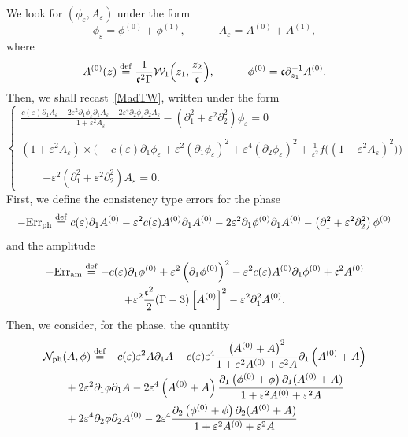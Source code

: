 \documentclass[10pt]{amsart}
\theoremstyle{definition}\newtheorem{defi}[theo]{Definition}\newtheorem{rema}[theo]{Remark}\newtheorem{exam}[theo]{Example}\newtheorem{exem}[theo]{Example}\newtheorem{nota}[theo]{Notation}
\newcommand*\p{\partial}
\newcommand*\ddef{\stackrel{\rm def}{=}}
\newcommand{\amm}{\mathrm{am}}
\newcommand{\phl}{\mathrm{ph}}
\newcommand{\Err}{\mathrm{Err}}
\newcommand*\BN{\mathcal{N}}
\newcommand*\BW{\mathcal{W}}
\newcommand*\ds{\displaystyle}
\newcommand*\cs{{\mathfrak c}}
\newcommand*\e{\varepsilon}
\newcommand*\G{\Gamma}
\begin{document}
We look for $ (\phi_\e, A_\e)$ under the form
\[
\phi_\e = \phi^{(0)} + \phi^{(1)},
\quad \quad \quad A_\e = A^{(0)} + A^{(1)},
\]
where
\begin{equation}\label{choixA-phi}
A^{(0)} (z) \ddef \frac{1}{\cs^2 \G} \BW_1 \Big(z_1, \frac{z_2}{\cs} \Big),
\quad \quad \quad \phi^{(0)} = \cs \p_{z_1}^{-1} A^{(0)}.
\end{equation} Then, we shall recast~\eqref{MadTW}, written under the form
\begin{equation*}
\left\{
\begin{array}{ll}
\ds{
\frac{ c(\e) \p_{1} A_\e - 2 \e^2 \p_{1} \phi_\e \p_{1} A_\e - 2 \e^4 \p_{2} \phi_\e \p_{2} A_\e }{ 1 + \e^2 A_\e } - \left(\p_{1}^2 + \e^2 \p^2_{2}\right) \phi_\e } = 0 \\ \ \\
\ds{ \left(1+\e^2 A_\e\right) \times \Big(- c(\e) \p_{1} \phi_\e + \e^2 (\p_{1} \phi_\e)^2 + \e^4 (\p_{2} \phi_\e)^2 + \frac{1}{\e^2} f \big(\left(1 +\e^2 A_\e\right)^2 \big) \Big)}
\\ \ \\ \qquad \ds{ - \e^2 \left(\p_{1}^2 + \e^2 \p_{2}^2\right) A_\e = 0}.
\end{array}\right.
\end{equation*}
First, we define the consistency type errors for the phase
\[
- \Err_{\phl}
\ddef c(\e) \p_{1} A^{(0)} - \e^2 c (\e) A^{(0)} \p_{1} A^{(0)} - 2 \e^2 \p_{1} \phi^{(0)} \p_{1} A^{(0)} - \left(\p_{1}^2 + \e^2 \p^2_{2}\right) \phi^{(0)}
\]
and the amplitude
\begin{multline*}
- \Err_{\amm} \ddef - c(\e) \p_{1} \phi^{(0)} + \e^2 \left(\p_{1} \phi^{(0)}\right)^2 - \e^2 c(\e) A^{(0)} \p_{1} \phi^{(0)} + \cs^2 A^{(0)}
\\+ \e^2 \frac{\cs^2}{2} (\Gamma -3) \left[A^{(0)}\right]^2 - \e^2 \p_{1}^2 A^{(0)}.
\end{multline*}
Then, we consider, for the phase, the quantity
\begin{multline}\label{def:sourceA}
\BN_{\phl} (A, \phi) \ddef - c(\e) \e^2 A \p_1 A - c(\e) \e^4 \frac{ \left(A^{(0)} + A\right)^2 }{ 1 + \e^2 A^{(0)} + \e^2 A } \p_{1} \left(A^{(0)} + A\right)
\\
\begin{aligned}
& + 2 \e^2 \p_1 \phi \p_1 A - 2 \e^4 \left(A^{(0)} + A\right) \frac{ \p_{1} \left(\phi^{(0)} + \phi\right) \p_{1} (A^{(0)} + A) }{ 1 + \e^2 A^{(0)} + \e^2 A }
\\ & + 2 \e^4 \p_2 \phi \p_2 A^{(0)} - 2 \e^4 \frac{ \p_{2} \left(\phi^{(0)} + \phi\right) \p_{2} (A^{(0)} + A) }{ 1 + \e^2 A^{(0)} + \e^2 A }
\end{aligned}
\end{multline}
\end{document}
